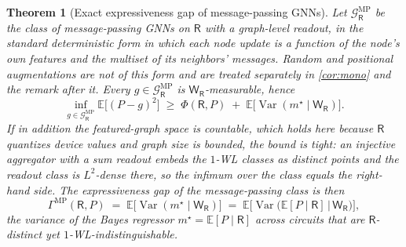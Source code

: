 \documentclass[10pt]{article}
\newtheorem{theorem}{Theorem}
\newcommand{\E}{\mathbb{E}}
\newcommand{\Var}{\operatorname{Var}}
\newcommand{\R}{\mathsf{R}}
\newcommand{\Gcal}{\mathcal{G}}
\newcommand{\W}{\mathsf{W}}
\begin{document}
\begin{theorem}[Exact expressiveness gap of message-passing GNNs]
\label{thm:wlgap}
Let $\Gcal^{\mathrm{MP}}_\R$ be the class of message-passing GNNs on $\R$ with a graph-level readout, in the standard deterministic form in which each node update is a function of the node's own features and the multiset of its neighbors' messages. Random and positional augmentations are not of this form and are treated separately in \cref{cor:mono} and the remark after it. Every $g\in\Gcal^{\mathrm{MP}}_\R$ is $\W_\R$-measurable, hence
\begin{equation}
\inf_{g\in\Gcal^{\mathrm{MP}}_\R}\E\!\big[(P-g)^2\big] \;\ge\; \Phi(\R,P) \;+\; \E\!\big[\Var(m^\star\mid \W_\R)\big].
\label{eq:wlbound}
\end{equation}
If in addition the featured-graph space is countable, which holds here because $\R$ quantizes device values and graph size is bounded, the bound is tight: an injective aggregator with a sum readout embeds the $1$-WL classes as distinct points and the readout class is $L^2$-dense there, so the infimum over the class equals the right-hand side. The expressiveness gap of the message-passing class is then
\begin{equation}
\Gamma^{\mathrm{MP}}(\R,P) \;=\; \E\!\big[\Var(m^\star\mid \W_\R)\big] \;=\; \E\!\big[\Var\!\big(\E[P\mid\R]\,\big|\, \W_\R\big)\big],
\label{eq:wlgap}
\end{equation}
the variance of the Bayes regressor $m^\star=\E[P\mid\R]$ across circuits that are $\R$-distinct yet $1$-WL-indistinguishable.
\end{theorem}
\end{document}
